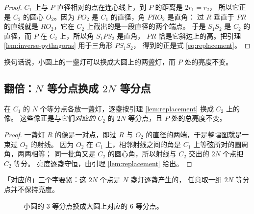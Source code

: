 \begin{proof}
$C_{1}$ 上与 $P$ 直径相对的点在连心线上，到 $P$ 的距离是 $2r_{1}=r_{2}$，
所以它正是 $C_{2}$ 的圆心 $O_{2}$。因为 $PO_{2}$ 是 $C_{1}$ 的直径，角 $PRO_{2}$ 是直角：
过 $R$ 垂直于 $PR$ 的直线就是 $RO_{2}$，它在 $C_{2}$ 上截出的是一段直径的两个端点。
于是 $S_{1}S_{2}$ 是 $C_{2}$ 的直径，而 $P$ 在 $C_{2}$ 上，所以角 $S_{1}PS_{2}$ 是直角，
$PR$ 恰是它斜边上的高。把引理 \ref{lem:inverse-pythagoras} 用于三角形 $PS_{1}S_{2}$，
得到的正是式 \eqref{eq:replacement}。
\end{proof}

换句话说，小圆上的一盏灯可以换成大圆上的两盏灯，而 $P$ 处的亮度不变。

\subsection{翻倍：$N$ 等分点换成 $2N$ 等分点}

\begin{lemma}[翻倍]\label{lem:doubling}
在 $C_{1}$ 的 $N$ 个等分点各放一盏灯，逐盏按引理 \ref{lem:replacement} 换成 $C_{2}$ 上的像。
这些像正是与它们\emph{对应的} $C_{2}$ 的 $2N$ 等分点，且 $P$ 处的总亮度不变。
\end{lemma}

\begin{proof}
一盏灯 $R$ 的像是一对点，即过 $R$ 与 $O_{2}$ 的直径的两端，于是整幅图就是一束过 $O_{2}$ 的射线。
因为 $O_{2}$ 在 $C_{1}$ 上，相邻射线之间的角是 $C_{1}$ 上等弦所对的圆周角，两两相等；
同一批角又是 $C_{2}$ 的圆心角，所以射线与 $C_{2}$ 交出的 $2N$ 个点把 $C_{2}$ 等分。
亮度逐盏守恒，由引理 \ref{lem:replacement} 给出。
\end{proof}

「对应的」三个字要紧：这 $2N$ 个点是 $N$ 盏灯逐盏产生的，
任意取一组 $2N$ 等分点并不保持亮度。

\begin{figure}[htbp]
\centering
{}
\caption{小圆的 $3$ 等分点换成大圆上对应的 $6$ 等分点。}
\label{fig:doubling}
\end{figure}

